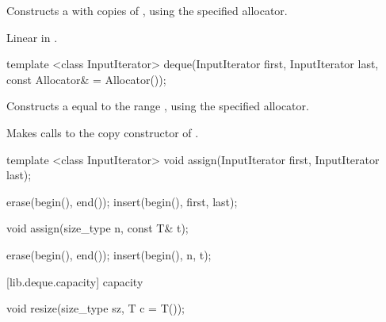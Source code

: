 \begin{itemdescr}
\pnum
\effects
Constructs a
with  copies of ,
using the specified allocator.

\pnum
\complexity
Linear in .
\end{itemdescr}

%
%
\begin{itemdecl}
template <class InputIterator>
  deque(InputIterator first, InputIterator last,
        const Allocator& = Allocator());
\end{itemdecl}

\begin{itemdescr}
\pnum
\effects
Constructs a
equal to the range
,
using the specified allocator.

\pnum
\complexity
Makes
calls to the copy constructor of .

\addtocounter{footnote}{1}%
\end{itemdescr}

%
\begin{itemdecl}
template <class InputIterator>
  void assign(InputIterator first, InputIterator last);
\end{itemdecl}

\begin{itemdescr}
\pnum
\effects
\begin{codeblock}
    erase(begin(), end());
    insert(begin(), first, last);
\end{codeblock}
\end{itemdescr}

%
%
\begin{itemdecl}
void assign(size_type n, const T& t);
\end{itemdecl}

\begin{itemdescr}
\pnum
\effects
\begin{codeblock}
    erase(begin(), end());
    insert(begin(), n, t);
\end{codeblock}
\end{itemdescr}

[lib.deque.capacity]{ capacity}

%
\begin{itemdecl}
void resize(size_type sz, T c = T());
\end{itemdecl}


